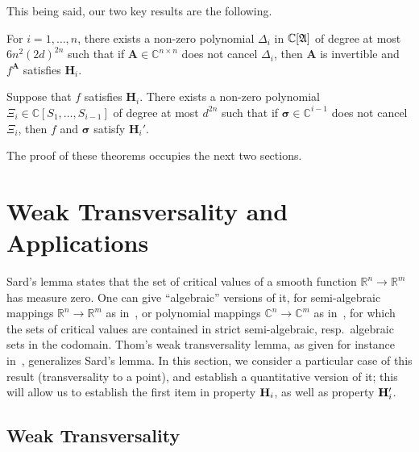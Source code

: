 \documentclass[sigconf]{acmart}
\def\mA{{\bm A}}
\def\C{\mathbb{C}}
\def\R{\mathbb{R}}
\def\D{\Delta}
\def\A{\frak{A}}
\begin{document}
\smallskip

This being said, our two key results are the following.
\begin{theorem}\label{theo:gen}
  For $i=1,\dots,n$, there exists a non-zero polynomial $\D_i$ in
  $\C[\A]$ of degree at most $6n^2(2d)^{2n}$ such that if $\mA \in
  \C^{n\times n}$ does not cancel $\D_i$, then $\mA$ is invertible and
  $f^\mA$ satisfies $\textbf{H}_i$.
\end{theorem}

\begin{theorem}\label{theo:Hp}
  Suppose that $f$ satisfies $\textbf{H}_i$. There exists a non-zero
  polynomial $\Xi_{i} \in \C[S_1,\dots,S_{i-1}]$ of degree at most
  $d^{2n}$ such that if $\bm \sigma \in \C^{i-1}$ does not
  cancel $\Xi_{i}$, then $f$ and $\bm \sigma$ satisfy $\textbf{H}_i'$.
\end{theorem}
\noindent 
The proof of these theorems occupies the next two sections.


\section{Weak Transversality and Applications}

Sard's lemma states that the set of critical values of a smooth
function $\R^n \to \R^m$ has measure zero. One can give ``algebraic''
versions of it, for semi-algebraic mappings $\R^n \to \R^m$ as
in~\cite[Chapter~9]{bochnak1998real}, or polynomial mappings $\C^n \to
\C^m$ as in~\cite[Chapter~3]{Mumford76}, for which the sets of
critical values are contained in strict semi-algebraic,
resp.\ algebraic sets in the codomain. Thom's weak transversality
lemma, as given for instance in~\cite{demazure2000bifurcations},
generalizes Sard's lemma. In this section, we consider a particular
case of this result (transversality to a point), and establish a
quantitative version of it; this will allow us to establish the first
item in property ${\bf H}_i$, as well as property ${\bf H}'_i$. 


\subsection{Weak Transversality}
\end{document}

